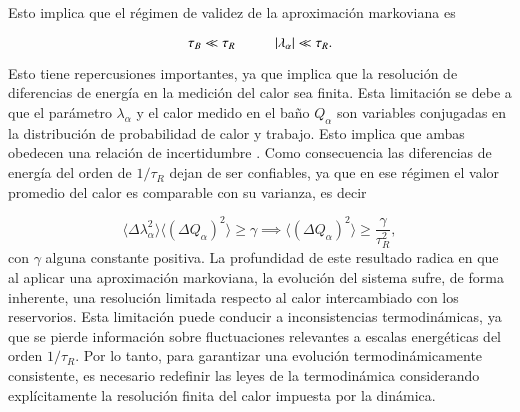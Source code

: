 Esto implica que el régimen de validez de la aproximación markoviana es 

\begin{equation*}
    \tau_{B} \ll \tau_{R} \hspace{10mm} |\lambda_{\alpha}| \ll \tau_{R}.
\end{equation*}

Esto tiene repercusiones importantes, ya que implica que la resolución de diferencias de energía en la medición del calor sea finita. Esta limitación se debe a que el parámetro $\lambda_{\alpha}$ y el calor medido en el baño $Q_{\alpha}$ son variables conjugadas en la distribución de probabilidad de calor y trabajo. Esto implica que ambas obedecen una relación de incertidumbre \cite{folland1997uncertainty}. Como consecuencia las diferencias de energía del orden de $1/\tau_{R}$ dejan de ser confiables, ya que en ese régimen el valor promedio del calor es comparable con su varianza, es decir

\begin{equation*}
    \langle \Delta \lambda^{2}_{\alpha} \rangle \langle (\Delta Q_{\alpha})^{2}\rangle \geq \gamma \implies \langle (\Delta Q_{\alpha})^{2}\rangle  \geq \frac{\gamma}{\tau^{2}_{R}},
\end{equation*}
con $\gamma$ alguna constante positiva. La profundidad de este resultado radica en que al aplicar una aproximación markoviana, la evolución del sistema sufre, de forma inherente, una resolución limitada respecto al calor intercambiado con los reservorios. Esta limitación puede conducir a inconsistencias termodinámicas, ya que se pierde información sobre fluctuaciones relevantes a escalas energéticas del orden $1/\tau_{R}$. Por lo tanto, para garantizar una evolución termodinámicamente consistente, es necesario redefinir las leyes de la termodinámica considerando explícitamente la resolución finita del calor impuesta por la dinámica.

\label{sec2:finiteresol}

